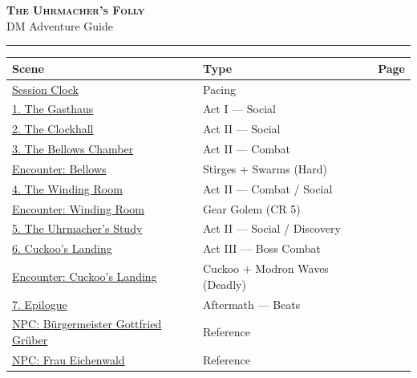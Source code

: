 \documentclass[10pt,letterpaper]{article}
\begin{document}

\thispagestyle{empty}
\begin{center}
{\LARGE\bfseries\scshape\textcolor{accent}{The Uhrmacher's Folly}}\\[2pt]
{\small DM Adventure Guide}\\[2pt]
\textcolor{rulecol}{\rule{0.5\textwidth}{0.8pt}}
\end{center}
\vspace{8pt}

\renewcommand{\arraystretch}{1.4}
\begin{tabularx}{\textwidth}{@{}lXr@{}}
\toprule
\textbf{Scene} & \textbf{Type} & \textbf{Page} \\
\midrule
\hyperref[sec:clock]{Session Clock} & Pacing & \pageref{sec:clock} \\
\hyperref[sec:gasthaus]{1. The Gasthaus} & Act I --- Social & \pageref{sec:gasthaus} \\
\hyperref[sec:clockhall]{2. The Clockhall} & Act II --- Social & \pageref{sec:clockhall} \\
\hyperref[sec:bellows]{3. The Bellows Chamber} & Act II --- Combat & \pageref{sec:bellows} \\
\hyperref[sec:enc-bellows]{\quad Encounter: Bellows} & Stirges + Swarms (Hard) & \pageref{sec:enc-bellows} \\
\hyperref[sec:gearroom]{4. The Winding Room} & Act II --- Combat / Social & \pageref{sec:gearroom} \\
\hyperref[sec:enc-gearroom]{\quad Encounter: Winding Room} & Gear Golem (CR 5) & \pageref{sec:enc-gearroom} \\
\hyperref[sec:study]{5. The Uhrmacher's Study} & Act II --- Social / Discovery & \pageref{sec:study} \\
\hyperref[sec:cuckoo]{6. Cuckoo's Landing} & Act III --- Boss Combat & \pageref{sec:cuckoo} \\
\hyperref[sec:enc-cuckoo]{\quad Encounter: Cuckoo's Landing} & Cuckoo + Modron Waves (Deadly) & \pageref{sec:enc-cuckoo} \\
\hyperref[sec:epilogue]{7. Epilogue} & Aftermath --- Beats & \pageref{sec:epilogue} \\
\midrule
\hyperref[sec:npc-gruber]{NPC: Bürgermeister Gottfried Grüber} & Reference & \pageref{sec:npc-gruber} \\
\hyperref[sec:npc-eichenwald]{NPC: Frau Eichenwald} & Reference & \pageref{sec:npc-eichenwald} \\

\end{tabularx}
\end{document}
